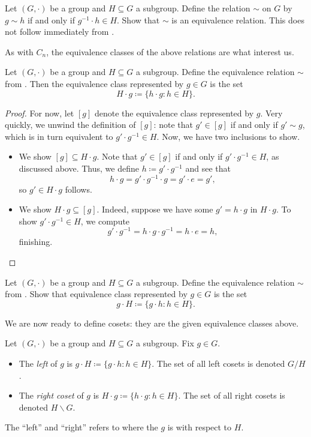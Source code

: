 \documentclass[../main.tex]{subfiles}
\begin{document}
\begin{exe} \label{exe:l-coset-equiv}
    Let $(G,\cdot)$ be a group and $H\subseteq G$ a subgroup. Define the relation $\sim$ on $G$ by $g\sim h$ if and only if $g^{-1}\cdot h\in H$. Show that $\sim$ is an equivalence relation. This does not follow immediately from .
\end{exe}
As with $C_n$, the equivalence classes of the above relations are what interest us.
\begin{lemma}
    Let $(G,\cdot)$ be a group and $H\subseteq G$ a subgroup. Define the equivalence relation $\sim$ from . Then the equivalence class represented by $g\in G$ is the set
    \[H\cdot g\coloneqq\{h\cdot g:h\in H\}.\]
\end{lemma}
\begin{proof}
    For now, let $[g]$ denote the equivalence class represented by $g$. Very quickly, we unwind the definition of $[g]$: note that $g'\in[g]$ if and only if $g'\sim g$, which is in turn equivalent to $g'\cdot g^{-1}\in H$. Now, we have two inclusions to show.
    \begin{itemize}
        \item We show $[g]\subseteq H\cdot g$. Note that $g'\in[g]$ if and only if $g'\cdot g^{-1}\in H$, as discussed above. Thus, we define $h\coloneqq g'\cdot g^{-1}$ and see that
        \[h\cdot g=g'\cdot g^{-1}\cdot g=g'\cdot e=g',\]
        so $g'\in H\cdot g$ follows.
        \item We show $H\cdot g\subseteq[g]$. Indeed, suppose we have some $g'=h\cdot g$ in $H\cdot g$. To show $g'\cdot g^{-1}\in H$, we compute
        \[g'\cdot g^{-1}=h\cdot g\cdot g^{-1}=h\cdot e=h,\]
        finishing.
        \qedhere
    \end{itemize}
\end{proof}
\begin{exe} \label{exe:define-left-coset}
    Let $(G,\cdot)$ be a group and $H\subseteq G$ a subgroup. Define the equivalence relation $\sim$ from . Show that equivalence class represented by $g\in G$ is the set
    \[g\cdot H\coloneqq\{g\cdot h:h\in H\}.\]
\end{exe}
We are now ready to define cosets: they are the given equivalence classes above.
\begin{definition}[coset]
    Let $(G,\cdot)$ be a group and $H\subseteq G$ a subgroup. Fix $g\in G$.
    \begin{itemize}
        \item The \textit{left } of $g$ is $g\cdot H\coloneqq\{g\cdot h:h\in H\}$. The set of all left cosets is denoted $G/H$.
        \item The \textit{right coset} of $g$ is $H\cdot g\coloneqq\{h\cdot g:h\in H\}$. The set of all right cosets is denoted $H\backslash G$.
    \end{itemize}
    The ``left'' and ``right'' refers to where the $g$ is with respect to $H$.
\end{definition}
\end{document}
